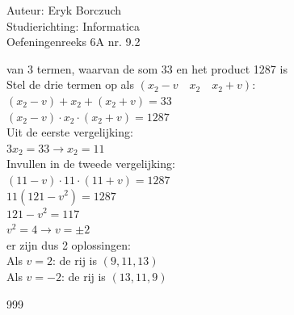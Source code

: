 \documentclass[a4paper]{article}
\begin{document}
  
\noindent \large Auteur: Eryk Borczuch \\
\noindent \large Studierichting: Informatica\\
\noindent \large Oefeningenreeks 6A nr. 9.2\\

\medskip

\normalsize

van 3 termen, waarvan de som 33 en het product 1287 is\\

Stel de drie termen op als $(x_2 - v \quad x_2 \quad x_2 + v)$:\\

$(x_2 - v) + x_2 + (x_2 + v) = 33$\\

$(x_2 - v) \cdot x_2 \cdot (x_2 + v) = 1287$\\

Uit de eerste vergelijking:\\

$3x_2 = 33 \rightarrow x_2 = 11$\\

Invullen in de tweede vergelijking:\\

$(11 - v) \cdot 11 \cdot (11 + v) = 1287$\\

$11(121 - v^2) = 1287$\\

$121 - v^2 = 117$\\

$v^2 = 4 \rightarrow v = \pm 2$\\

er zijn dus 2 oplossingen:\\

Als $v = 2$: de rij is $(9, 11 , 13)$\\

Als $v = -2$: de rij is $(13 , 11 , 9)$\\


\begin{thebibliography}{999}
\end{thebibliography}
\end{document}
